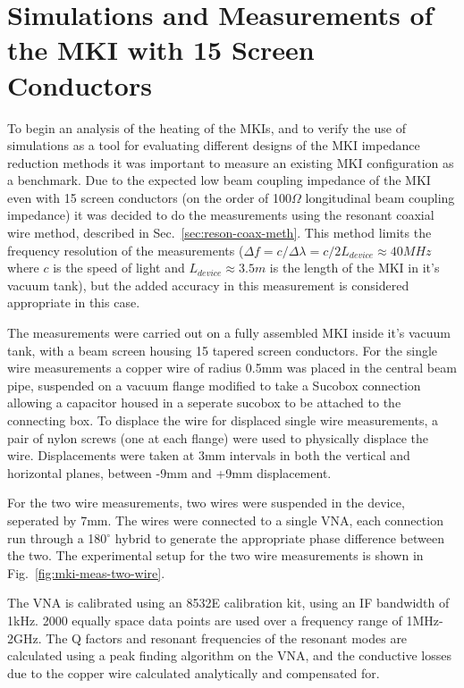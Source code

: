 \section{Simulations and Measurements of the MKI with 15 Screen Conductors}

To begin an analysis of the heating of the MKIs, and to verify the use of simulations as a tool for evaluating different designs of the MKI impedance reduction methods it was important to measure an existing MKI configuration as a benchmark. Due to the expected low beam coupling impedance of the MKI even with 15 screen conductors (on the order of 100$\Omega$ longitudinal beam coupling impedance) it was decided to do the measurements using the resonant coaxial wire method, described in Sec.~\ref{sec:reson-coax-meth}. This method limits the frequency resolution of the measurements ($\Delta{} f = c/ \Delta \lambda = c/2L_{device} \approx 40MHz$ where $c$ is the speed of light and $L_{device}\approx 3.5m$ is the length of the MKI in it's vacuum tank), but the added accuracy in this measurement is considered appropriate in this case.

The measurements were carried out on a fully assembled MKI inside it's vacuum tank, with a beam screen housing 15 tapered screen conductors. For the single wire measurements a copper wire of radius 0.5mm was placed in the central beam pipe, suspended on a vacuum flange modified to take a Sucobox connection allowing a capacitor housed in a seperate sucobox to be attached to the connecting box. To displace the wire for displaced single wire measurements, a pair of nylon screws (one at each flange) were used to physically displace the wire. Displacements were taken at 3mm intervals in both the vertical and horizontal planes, between -9mm and +9mm displacement.

For the two wire measurements, two wires were suspended in the device, seperated by 7mm. The wires were connected to a single VNA, each connection run through a 180$^{\circ}$ hybrid to generate the appropriate phase difference between the two. The experimental setup for the two wire measurements is shown in Fig.~\ref{fig:mki-meas-two-wire}.

The VNA is calibrated using an 8532E calibration kit, using an IF bandwidth of 1kHz. 2000 equally space data points are used over a frequency range of 1MHz-2GHz. The Q factors and resonant frequencies of the resonant modes are calculated using a peak finding algorithm on the VNA, and the conductive losses due to the copper wire calculated analytically and compensated for.

